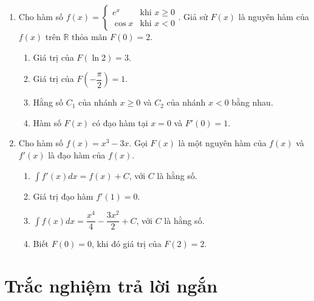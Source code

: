 \documentclass[12pt]{article}
\begin{document}
\begin{enumerate}[label=\textbf{Câu \arabic*.}, start=1]
		\item Cho hàm số $f(x) = \begin{cases} e^x & \text{khi } x \ge 0 \\ \cos x & \text{khi } x < 0 \end{cases}$. Giả sử $F(x)$ là nguyên hàm của $f(x)$ trên $\mathbb{R}$ thỏa mãn $F(0) = 2$.
		\begin{enumerate}[label=\alph*)]
			\item Giá trị của $F(\ln 2) = 3$.
			\item Giá trị của $F\left(-\dfrac{\pi}{2}\right) = 1$.
			\item Hằng số $C_1$ của nhánh $x \ge 0$ và $C_2$ của nhánh $x < 0$ bằng nhau.
			\item Hàm số $F(x)$ có đạo hàm tại $x = 0$ và $F'(0) = 1$.
		\end{enumerate}
		
		\item Cho hàm số $f(x) = x^3 - 3x$. Gọi $F(x)$ là một nguyên hàm của $f(x)$ và $f'(x)$ là đạo hàm của $f(x)$.
		\begin{enumerate}[label=\alph*)]
			\item $\displaystyle \int f'(x) dx = f(x) + C$, với $C$ là hằng số.
			\item Giá trị đạo hàm $f'(1) = 0$.
			\item $\displaystyle \int f(x) dx = \dfrac{x^4}{4} - \dfrac{3x^2}{2} + C$, với $C$ là hằng số.
			\item Biết $F(0) = 0$, khi đó giá trị của $F(2) = 2$.
		\end{enumerate}
		
	\end{enumerate}
	
	\section{Trắc nghiệm trả lời ngắn}
	
\end{document}
